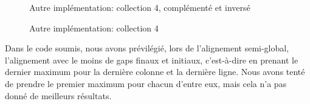 \begin{figure}[!ht]
\begin{minipage}[c]{.46\linewidth}
\begin{center}
		Autre implémentation: collection 4, complémenté et inversé
	\end{center}
	\end{minipage}
	\label{fig:autre_impl_4}
	\caption{Autre implémentation: collection 4}
\end{figure}

\FloatBarrier

Dans le code soumis, nous avons prévilégié, lors de l'alignement semi-global,
l'alignement avec le moins de gaps finaux et initiaux, c'est-à-dire en
prenant le dernier maximum pour la dernière colonne et la dernière ligne. Nous
avons tenté de prendre le premier maximum pour chacun d'entre eux, mais cela n'a
pas donné de meilleurs résultats.

